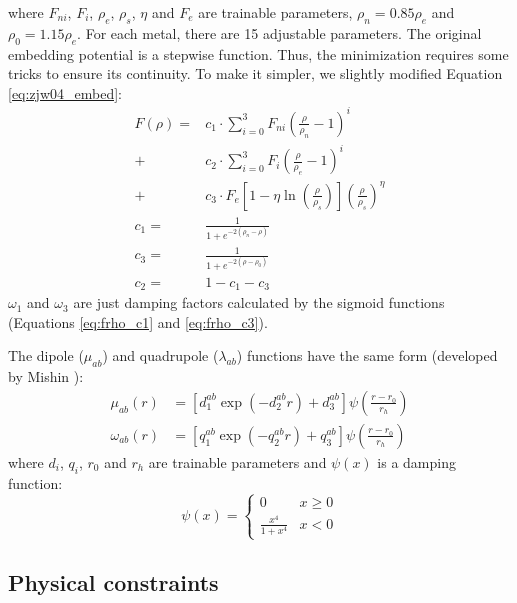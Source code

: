 \documentclass[prb,reprint]{revtex4-2}
\begin{document}
where $F_{ni}$, $F_{i}$, $\rho_e$, $\rho_s$, $\eta$ and $F_{e}$ are trainable 
parameters, $\rho_n=0.85\rho_e$ and $\rho_0=1.15\rho_e$. For each metal, there 
are 15 adjustable parameters. The original embedding potential is a stepwise 
function. Thus, the minimization requires some tricks to ensure its continuity.
To make it simpler, we slightly modified Equation \ref{eq:zjw04_embed}:
\begin{align}
\label{eq:zjw04xc_embed}
F(\rho) 
= & c_1 \cdot
\sum_{i=0}^{3}{F_{ni}\left( \frac{\rho}{\rho_n} - 1 \right)^{i}} \nonumber \\
+ & c_2 \cdot 
\sum_{i=0}^{3}{F_{i}\left( \frac{\rho}{\rho_e} - 1 \right)^{i}} \nonumber \\
+ & c_3 \cdot
F_{e}\left[1 - \eta\ln\left( \frac{\rho}{\rho_s}\right)\right]
(\frac{\rho}{\rho_s})^{\eta} \\
\label{eq:frho_c1}
c_{1} = & \frac{1}{1 + e^{-2\left(\rho_{n} - \rho\right)}} \\
\label{eq:frho_c3}
c_{3} = & \frac{1}{1 + e^{-2\left(\rho - \rho_{0}\right)}} \\
c_{2} = & 1 - c_1 - c_3
\end{align}
$\omega_1$ and $\omega_3$ are just damping factors calculated by the sigmoid 
functions (Equations \ref{eq:frho_c1} and \ref{eq:frho_c3}).

The dipole ($\mu_{ab}$) and quadrupole ($\lambda_{ab}$) functions have the same 
form (developed by Mishin \cite{ADP0}):
\begin{align}
\label{eq:adp_dipole}
\mu_{ab}(r) & = \left[
    d_{1}^{ab} \exp\left( -d_{2}^{ab}r \right) + d_{3}^{ab}
\right] \psi\left( \frac{r - r_{0}}{r_{h}} \right) \\
\omega_{ab}(r) & = \left[
    q_{1}^{ab} \exp\left( -q_{2}^{ab}r \right) + q_{3}^{ab}
\right] \psi\left( \frac{r - r_{0}}{r_{h}} \right)
\end{align}
where $d_{i}$, $q_{i}$, $r_0$ and $r_{h}$ are trainable parameters and $\psi(x)$
is a damping function:
\begin{equation}
\label{eq:mishin_cutoff}
\psi(x) = \begin{cases}
    0 & x \ge 0 \\
    \frac{x^4}{1 + x^4} & x < 0 
\end{cases}
\end{equation}

\subsection{Physical constraints}
\label{sec:constraints}
\end{document}

